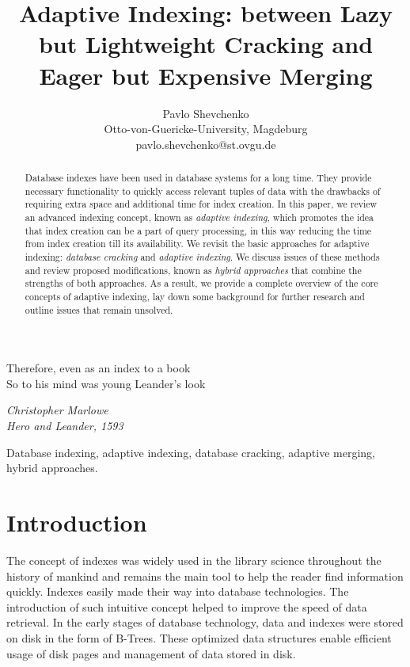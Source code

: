 \documentclass[10pt, conference, compsocconf]{IEEEtran}
\begin{document}
\title{Adaptive Indexing: between Lazy but Lightweight Cracking and Eager but Expensive Merging}
\author{Pavlo Shevchenko \\ Otto-von-Guericke-University, Magdeburg \\ pavlo.shevchenko@st.ovgu.de}

\maketitle

\epigraph{Therefore, even as an index to a book \\
So to his mind was young Leander's look}{\textit{Christopher Marlowe\\Hero and Leander, 1593}}

\begin{abstract}
Database indexes have been used in database systems for a long time. They provide necessary functionality to quickly access relevant tuples of data with the drawbacks of requiring extra space and additional time for index creation. In this paper, we review an advanced indexing concept, known as \emph{adaptive indexing}, which promotes the idea that index creation can be a part of query processing, in this way reducing the time from index creation till its availability. We revisit the basic approaches for adaptive indexing: \emph{database cracking} and \emph{adaptive indexing}. We discuss issues of these methods and review proposed modifications, known as \emph{hybrid approaches} that combine the strengths of both approaches. As a result, we provide a complete overview of the core concepts of adaptive indexing, lay down some background for further research and outline issues that remain unsolved.\\
\end{abstract}

\begin{IEEEkeywords}
Database indexing, adaptive indexing, database cracking, adaptive merging, hybrid approaches.
\end{IEEEkeywords}

\section{Introduction}
The concept of indexes was widely used in the library science throughout the history of mankind and remains the main tool to help the reader find information quickly. Indexes easily made their way into database technologies. The introduction of such intuitive concept helped to improve the speed of data retrieval. In the early stages of database technology, data and indexes were stored on disk in the form of B-Trees. These optimized data structures enable efficient usage of disk pages and management of data stored in disk.
\end{document}
